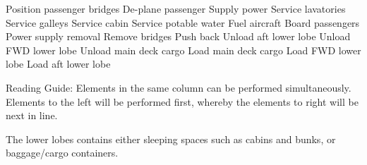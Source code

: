 Position passenger bridges
	De-plane passenger
	Supply power
		Service lavatories
		Service galleys
		Service cabin
		Service potable water
		Fuel aircraft
			Board passengers
				Power supply removal
				Remove bridges
					Push back
	Unload aft lower lobe
	Unload FWD lower lobe
		Unload main deck cargo
			Load main deck cargo
			Load FWD lower lobe
			Load aft lower lobe
			
			
Reading Guide:
	Elements in the same column can be performed simultaneously. 
	Elements to the left will be performed first, whereby the elements to right will be next in line.
	
The lower lobes contains either sleeping spaces such as cabins and bunks, or baggage/cargo containers\cite{Algo_lobe}.